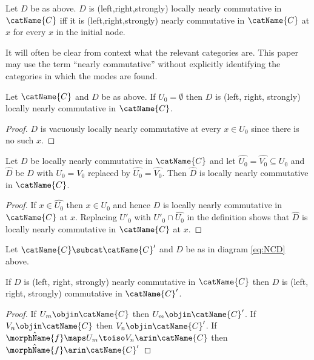 \documentclass{article}
\begin{document}
\begin{definition}
\label{def:NCDl}
Let $D$ be as above. $D$ is (left,right,strongly) locally nearly
commutative in $\catName{C}$ iff it is (left,right,strongly) nearly
commutative in $\catName{C}$ at $x$ for every $x$ in the initial node.
\end{definition}

\begin{remark}
It will often be clear from context what the relevant categories are.
This paper may use the term ``nearly commutative'' without explicitly
identifying the categories in which the modes are found.
\end{remark}

\begin{lemma}
\label{lem:NCD}
Let $\catName{C}$ and $D$ be as above. If $U_0 = \emptyset$ then $D$ is
(left, right, strongly) locally nearly commutative in $\catName{C}$.

\begin{proof}
$D$ is vacuously locally nearly commutative at every $x \in U_0$ since
there is no such $x$.
\end{proof}

Let $D$ be locally nearly commutative in $\catName{C}$ and
let $\hat{U_0}=\hat{V_0} \subseteq U_0$ and $\hat{D}$ be $D$ with
$U_0=V_0$ replaced by $\hat{U_0}=\hat{V_0}$. Then $\hat{D}$ is locally
nearly commutative in $\catName{C}$.

\begin{proof}
If $x \in \hat{U_0}$ then $x \in U_0$ and hence $D$ is locally nearly
commutative in $\catName{C}$ at $x$.
Replacing $U'_0$ with $U'_0 \cap \hat{U_0}$ in the definition shows that
$\hat{D}$ is locally nearly commutative in $\catName{C}$ at $x$.
\end{proof}
\end{lemma}

\begin{lemma}
\label{lem:NCDsubcat}
Let $\catName{C} \subcat \catName{C}'$ and $D$ be as in diagram
\eqref{eq:NCD} above.

If $D$ is (left, right, strongly) nearly commutative in $\catName{C}$
then $D$ is (left, right, strongly) commutative in $\catName{C}'$.

\begin{proof}
If $U_m \objin \catName{C}$ then $U_m \objin \catName{C}'$.
If $V_n \objin \catName{C}$ then $V_n \objin \catName{C}'$.
If $\hat{\morphName{f}} \maps U_m \toiso V_n \arin \catName{C}$ then
$\hat{\morphName{f}} \arin \catName{C}'$
\end{proof}
\end{lemma}
\end{document}
